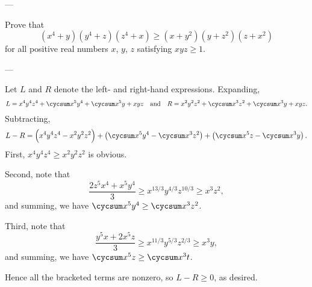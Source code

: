 
---

Prove that
\[(x^4+y)(y^4+z)(z^4+x)\ge(x+y^2)(y+z^2)(z+x^2)\]
for all positive real numbers $x$, $y$, $z$ satisfying $xyz\ge1$.

---

Let $L$ and $R$ denote the left- and right-hand expressions. Expanding,
\[L=x^4y^4z^4+\cycsum x^5y^4+\cycsum x^5y+xyz\quad\text{and}\quad R=x^2y^2z^2+\cycsum x^3z^2+\cycsum x^3y+xyz.\]
Subtracting,
\[L-R=\Big(x^4y^4z^4-x^2y^2z^2\Big)+\left(\cycsum x^5y^4-\cycsum x^3z^2\right)+\left(\cycsum x^5z-\cycsum x^3y\right).\]
First, $x^4y^4z^4\ge x^2y^2z^2$ is obvious.

Second, note that
\[\frac{2z^5x^4+x^5y^4}3\ge x^{13/3}y^{4/3}z^{10/3}\ge x^3z^2,\]
and summing, we have $\cycsum x^5y^4\ge\cycsum x^3z^2$.

Third, note that
\[\frac{y^5x+2x^5z}3\ge x^{11/3}y^{5/3}z^{2/3}\ge x^3y,\]
and summing, we have $\cycsum x^5z\ge\cycsum x^3t$.

Hence all the bracketed terms are nonzero, so $L-R\ge0$, as desired.

